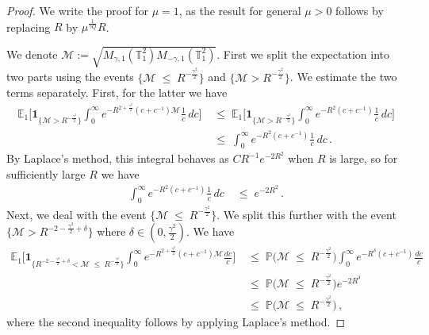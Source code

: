\documentclass[11pt]{article}
\numberwithin{equation}{section}
\theoremstyle{definition}
\renewcommand{\leq}{\;\leqslant\;}                   %
\newcommand{\E}{\mathbb{E}}
\renewcommand{\P}{\mathbb{P}}
\def\T{\mathbb{T}}
\newcommand{\les}{<}
\newcommand{\grea}{>}
\newcommand{\tor}{{\T_1^2}}
\begin{document}
\begin{proof}
We write the proof for $\mu=1$, as the result for general $\mu>0$ follows by replacing $R$ by $\mu^{\frac{1}{\gamma Q}} R$.

We denote $\mathcal{M} := \sqrt{M_{\gamma,1}(\tor)M_{-\gamma,1}(\tor)}$. First we split the expectation into two parts using the events $\{\mathcal{M} \leq   R^{- \frac{\gamma^2}{2}}\}$ and $\{ \mathcal{M} \grea  R^{- \frac{\gamma^2}{2}}\}$. We estimate the two terms separately. First, for the latter we have
\begin{align*}
\E_1 \Big[ \mathbf{1}_{ \{   \mathcal{M} \grea  R^{-\frac{\gamma^2}{2}} \} } \int_0^\infty e^{-  R^{2 + \frac{\gamma^2}{2}}  (c+c^{-1}) \mathcal{M} } \tfrac{1}{c} \, dc \Big] & \leq \E_1 \Big[ \mathbf{1}_{ \{  \mathcal{M} \grea   R^{-\frac{\gamma^2}{2}} \} } \int_0^\infty e^{-  R^2  (c+c^{-1}) } \tfrac{1}{c} \, dc\Big] \\
&\leq \int_0^\infty e^{-   R^2  (c+c^{-1}) } \tfrac{1}{c} \, dc\,.
\end{align*}
By Laplace's method, this integral behaves as $C  R^{-1} e^{-2  R^2}$ when $R$ is large, so for sufficiently large $R$ we have 
\begin{align*}
\int_0^\infty e^{-   R^2  (c+c^{-1}) } \tfrac{1}{c} \, dc & \leq e^{-2   R^2}\,.
\end{align*}
Next, we deal with the event $\{ \mathcal{M} \leq  R^{-\frac{\gamma^2}{2}} \}$. We split this further with the event $\{   \mathcal{M} \grea  R^{-2 - \frac{\gamma^2}{2} + \delta } \}$ where $\delta \in (0, \frac{\gamma^2}{2})$. We have
\begin{align*}
\E_1 \Big[ \mathbf{1}_{ \{ R^{-2 - \frac{\gamma^2}{2} + \delta } \les  \mathcal{M} \leq  R^{-\frac{\gamma^2}{2}} \} } \int_0^\infty e^{-  R^{2 + \frac{\gamma^2}{2}}  (c+c^{-1}) \mathcal{M} } \tfrac{dc}{c} \Big] & \leq \P \big(   \mathcal{M} \leq  R^{- \frac{\gamma^2}{2}} \big) \int_0^\infty e^{-  R^{\delta} (c+c^{-1}) } \tfrac{dc}{c}  \\
& \leq \P \big(   \mathcal{M} \leq  R^{- \frac{\gamma^2}{2}} \big) e^{-2  R^\delta} \\
& \leq \P \big(   \mathcal{M} \leq  R^{- \frac{\gamma^2}{2}} \big)\,,
\end{align*}
where the second inequality follows by applying Laplace's method.


\end{proof}
\end{document}
